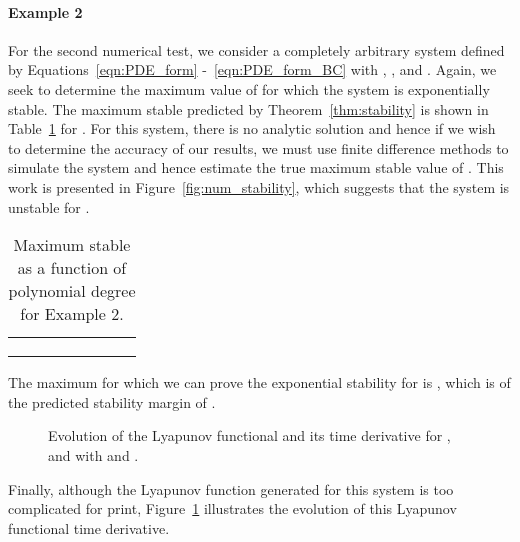 \documentclass[9pt,journal,twocolumn]{IEEEtran}
\begin{document}
\paragraph*{Example 2} For the second numerical test, we consider a completely arbitrary system defined by Equations~\eqref{eqn:PDE_form} -~\eqref{eqn:PDE_form_BC} with , ,  and . Again, we seek to determine the maximum value of  for which the system is exponentially stable. The maximum stable  predicted by Theorem~\ref{thm:stability} is shown in Table~\ref{table_analysis_1} for . For this system, there is no analytic solution and hence if we wish to determine the accuracy of our results, we must use finite difference methods to simulate the system and hence estimate the true maximum stable value of . This work is presented in Figure~\ref{fig:num_stability}, which suggests that the system is unstable for .
\begin{table}{}
\begin{center}
    \begin{tabular}{l *{7}{c}}\hline \hline
 &  &  &  &  &  \\ \hline
 &   &  &  &  &  \\
 &  &  &  &  &  \\
 &  &  &  &  & 
\end{tabular}
\end{center}
\caption{Maximum stable  as a function of polynomial degree for Example 2.}
\label{table_analysis_1}
\end{table}
The maximum  for which we can prove the exponential stability for is , which is  of the predicted stability margin of .
\begin{figure}[ht]
\centering
{}
\quad
{}
\caption{Evolution of the Lyapunov functional and its time derivative for ,  and  with  and .}
\label{fig:V_analysis}
\end{figure}
Finally, although the Lyapunov function generated for this system is too complicated for print, Figure~\ref{fig:V_analysis} illustrates the evolution of this Lyapunov functional time derivative.
\end{document}
